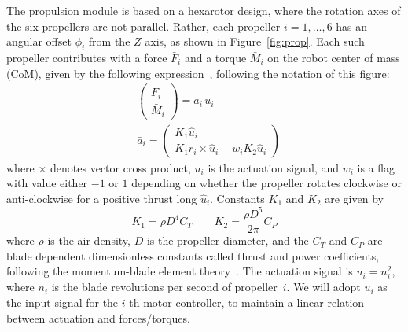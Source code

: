 \documentclass{article}
\begin{document}
The propulsion module is based on a hexarotor design, where the
rotation axes of the six propellers are not parallel. Rather, each
propeller $i=1,\ldots,6$ has an angular offset $\phi_i$ from the $Z$ axis, as shown in
Figure~\ref{fig:prop}. Each such propeller contributes with a force
$\bar{F}_i$ and a torque $\bar{M}_i$ on the robot center of mass (CoM), given by the following
expression~\cite{yoda:arxiv16a}, following the notation of this figure:
\begin{equation}
  \begin{aligned}
    &\left(
      \begin{array}{c}
        \bar{F}_i \\
        \bar{M}_i
      \end{array}
    \right) = \bar{a}_i\,u_i \\
    &\bar{a}_i = \left(
      \begin{array}{c}
        K_1 \hat{u}_i \\
        K_1 \bar{r}_i \times \hat{u}_i - w_i K_2 \hat{u}_i
      \end{array}\right)
  \end{aligned}
\end{equation}
where $\times$ denotes vector cross product, $u_i$ is the actuation
signal, and $w_i$ is a flag with value either $-1$ or $1$ depending on
whether the propeller rotates clockwise or anti-clockwise for a
positive thrust long $\hat{u}_i$.  Constants $K_1$ and $K_2$ are given by
\begin{equation}
  \label{eq:blade}
  K_1 = \rho D^4 C_T \qquad K_2 = \frac{\rho D^5}{2\pi} C_P
\end{equation}
where $\rho$ is the air density, $D$ is the propeller diameter, and
the $C_T$ and $C_P$ are blade dependent dimensionless constants called
thrust and power coefficients, following the momentum-blade element
theory~\cite{mccormick95}. The actuation signal is $u_i=n_i^2$, where
$n_i$ is the blade revolutions per second of propeller~$i$. We will
adopt $u_i$ as the input signal for the $i$-th motor controller, to
maintain a linear relation between actuation and forces/torques.
\end{document}
